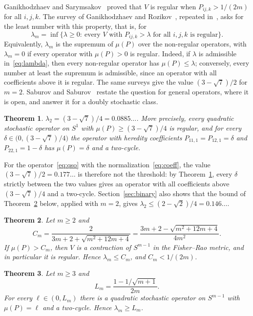 \documentclass[11pt]{amsart}
\newtheorem{theorem}{Theorem}[section]
\theoremstyle{definition}
\theoremstyle{remark}
\begin{document}
Ganikhodzhaev and Sarymsakov~\cite{GS88} proved that $V$ is regular when $P_{ij,k}>1/(2m)$ for all $i,j,k$. The
survey of Ganikhodzhaev and Rozikov~\cite[Theorem~7 and Problem~12]{GR09}, repeated in~\cite[Theorem~2.28 and
Problem~2.29]{GMR11}, asks for the least number with this property, that is, for
\begin{equation}\label{eq:lambda}
\lambda_m=\inf\bigl\{\lambda\ge0:\ \text{every $V$ with $P_{ij,k}>\lambda$ for all $i,j,k$ is regular}\bigr\}.
\end{equation}
Equivalently, $\lambda_m$ is the supremum of $\mu(P)$ over the non-regular operators, with $\lambda_m=0$ if every
operator with $\mu(P)>0$ is regular. Indeed, if $\lambda$ is admissible in~\eqref{eq:lambda}, then every non-regular
operator has $\mu(P)\le\lambda$; conversely, every number at least the supremum is admissible, since an operator with
all coefficients above it is regular. The same surveys give the value $(3-\sqrt7)/2$ for $m=2$. Saburov and
Saburov~\cite{SS25} restate the question for general operators, where it is open, and answer it for a doubly
stochastic class.

\begin{theorem}\label{thm:binary}
$\lambda_2=(3-\sqrt7)/4=0.0885\dots$. More precisely, every quadratic stochastic operator on $S^1$ with
$\mu(P)\ge(3-\sqrt7)/4$ is regular, and for every $\delta\in\bigl(0,(3-\sqrt7)/4\bigr)$ the operator with heredity
coefficients $P_{11,1}=P_{12,1}=\delta$ and $P_{22,1}=1-\delta$ has $\mu(P)=\delta$ and a two-cycle.
\end{theorem}

For the operator~\eqref{eq:qso} with the normalization~\eqref{eq:coeff}, the value $(3-\sqrt7)/2=0.177\dots$ is therefore
not the threshold: by Theorem~\ref{thm:binary}, every $\delta$ strictly between the two values gives an operator with
all coefficients above $(3-\sqrt7)/4$ and a two-cycle. Section~\ref{sec:binary} also shows that the bound of
Theorem~\ref{thm:upper} below, applied with $m=2$, gives $\lambda_2\le(2-\sqrt2)/4=0.146\dots$.

\begin{theorem}\label{thm:upper}
Let $m\ge2$ and
\[
C_m=\frac{2}{3m+2+\sqrt{m^2+12m+4}}=\frac{3m+2-\sqrt{m^2+12m+4}}{4m^2}.
\]
If $\mu(P)>C_m$, then $V$ is a contraction of $S^{m-1}$ in the Fisher--Rao metric, and in particular it is regular.
Hence $\lambda_m\le C_m$, and $C_m<1/(2m)$.
\end{theorem}

\begin{theorem}\label{thm:lower}
Let $m\ge3$ and
\[
L_m=\frac{1-1/\sqrt{m+1}}{2m}.
\]
For every $\ell\in(0,L_m)$ there is a quadratic stochastic operator on $S^{m-1}$ with $\mu(P)=\ell$ and a two-cycle.
Hence $\lambda_m\ge L_m$.
\end{theorem}
\end{document}
